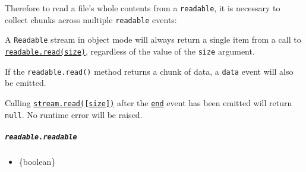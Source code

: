 Therefore to read a file's whole contents from a \texttt{readable}, it
is necessary to collect chunks across multiple
\texttt{\textquotesingle{}readable\textquotesingle{}} events:

\begin{Shaded}
\begin{Highlighting}[]
\OperatorTok{=}\NormalTok{ []}\OperatorTok{;}

\NormalTok{(}\OperatorTok{,}\NormalTok{ () }\KeywordTok{=\textgreater{}}\NormalTok{ \{}
  \OperatorTok{;}
  \NormalTok{ (} \OperatorTok{!==}\OperatorTok{=}\NormalTok{())) \{}
\OperatorTok{;}
\NormalTok{  \}}
\NormalTok{\})}\OperatorTok{;}

\NormalTok{(}\OperatorTok{,}\NormalTok{ () }\KeywordTok{=\textgreater{}}\NormalTok{ \{}
  \OperatorTok{=}\NormalTok{(}\StringTok{\textquotesingle{}\textquotesingle{}}\NormalTok{)}\OperatorTok{;}
\NormalTok{\})}\OperatorTok{;}
\end{Highlighting}
\end{Shaded}

A \texttt{Readable} stream in object mode will always return a single
item from a call to
\hyperref[readablereadsize]{\texttt{readable.read(size)}}, regardless of
the value of the \texttt{size} argument.

If the \texttt{readable.read()} method returns a chunk of data, a
\texttt{\textquotesingle{}data\textquotesingle{}} event will also be
emitted.

Calling \hyperref[readablereadsize]{\texttt{stream.read({[}size{]})}}
after the
\hyperref[event-end]{\texttt{\textquotesingle{}end\textquotesingle{}}}
event has been emitted will return \texttt{null}. No runtime error will
be raised.

\subparagraph{\texorpdfstring{\texttt{readable.readable}}{readable.readable}}\label{readable.readable}

\begin{itemize}
\tightlist
\item
  \{boolean\}
\end{itemize}

